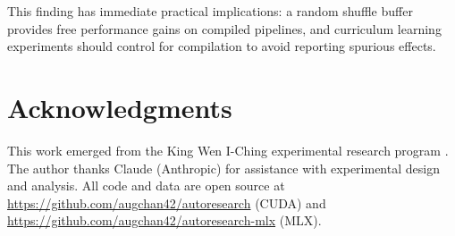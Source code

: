 \documentclass{article}
\begin{document}
This finding has immediate practical implications: a random shuffle
buffer provides free performance gains on compiled pipelines, and
curriculum learning experiments should control for compilation to avoid
reporting spurious effects.

\section*{Acknowledgments}

This work emerged from the King Wen I-Ching experimental research
program \cite{chan2025kingwen}. The author thanks Claude (Anthropic)
for assistance with experimental design and analysis. All code and
data are open source at
\url{https://github.com/augchan42/autoresearch} (CUDA) and
\url{https://github.com/augchan42/autoresearch-mlx} (MLX).



\end{document}
